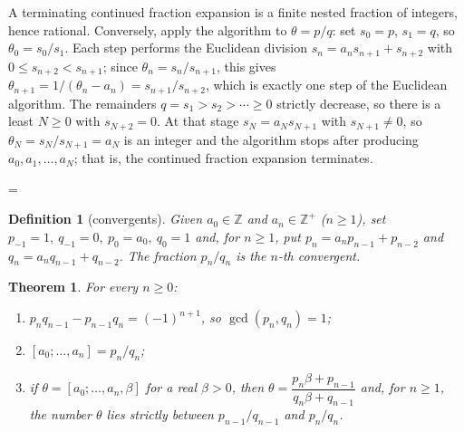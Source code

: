 \documentclass[11pt]{article}
\makeatletter
\theoremstyle{ntstyle}
\newtheorem{theorem}{Theorem}[subsection]
\newtheorem{definition}{Definition}[subsection]
\let\nt@closedisplay\]
\def\nt@guardedclose{\@ifnextchar\par{\nt@closeafterpar}{\@ifnextchar\end{\postdisplaypenalty\@M\nt@closedisplay}{\nt@closedisplay}}}
\def\nt@closeafterpar\par{\@ifnextchar\par{\nt@closeafterpar}{\@ifnextchar\end{\postdisplaypenalty\@M\nt@closedisplay\par}{\nt@closedisplay\par}}}
\renewenvironment{proof}[1][\proofname]{\par
  \pushQED{\qed}\normalfont\topsep\medskipamount\edef\nt@afterproof{\@endparpenalty=\the\@endparpenalty\relax}\@beginparpenalty\@M\@endparpenalty\@M\let\]\nt@guardedclose\trivlist\item[]\textit{#1\@addpunct{.}} \ignorespaces}{\ifvmode\addpenalty\@M\fi\popQED\nt@afterproof\endtrivlist\@endpefalse}
\makeatother
\begin{document}
\begin{proof} A terminating continued fraction expansion is a finite nested
	fraction of integers, hence rational. Conversely, apply the algorithm to
	$\theta=p/q$: set $s_0=p$, $s_1=q$, so $\theta_0=s_0/s_1$. Each step performs
	the Euclidean division $s_n=a_ns_{n+1}+s_{n+2}$ with
	$0\le s_{n+2}<s_{n+1}$; since $\theta_n=s_n/s_{n+1}$, this gives
	$\theta_{n+1}=1/(\theta_n-a_n)=s_{n+1}/s_{n+2}$, which is exactly one step of the Euclidean algorithm. The remainders $q=s_1>s_2>\cdots\ge0$ strictly decrease,
	so there is a least $N\ge0$ with $s_{N+2}=0$. At that stage
	$s_N=a_Ns_{N+1}$ with $s_{N+1}\neq0$, so
	$\theta_N=s_N/s_{N+1}=a_N$ is an integer and the algorithm stops after
	producing $a_0,a_1,\ldots,a_N$; that is, the continued fraction expansion
	terminates.

\end{proof}
\begin{definition}[convergents]\label{def:10.3.2} Given
	$a_0\in\mathbb{Z}$ and $a_n\in\mathbb{Z}^+$ ($n\ge1$), set
	$p_{-1}=1,\ q_{-1}=0,\ p_0=a_0,\ q_0=1$ and, for $n\ge1$,
	put $p_n=a_np_{n-1}+p_{n-2}$ and $q_n=a_nq_{n-1}+q_{n-2}$. The fraction
	$p_n/q_n$ is the $n$-th convergent.

\end{definition}
\begin{theorem}\label{thm:10.3.3} For every $n\ge0$:
	\begin{enumerate}[label={\alph*)}]
		\item $p_nq_{n-1}-p_{n-1}q_n=(-1)^{n+1}$, so
		      $\gcd(p_n, q_n)=1$;
		\item $[a_0;\ldots,a_n]=p_n/q_n$;
		\item if $\theta=[a_0;\ldots,a_n,\beta]$ for a real $\beta>0$, then
		      $\theta=\dfrac{p_n\beta+p_{n-1}}{q_n\beta+q_{n-1}}$ and, for
		      $n\ge1$, the number $\theta$ lies strictly between
		      $p_{n-1}/q_{n-1}$ and $p_n/q_n$.
	\end{enumerate}

\end{theorem}
\end{document}

